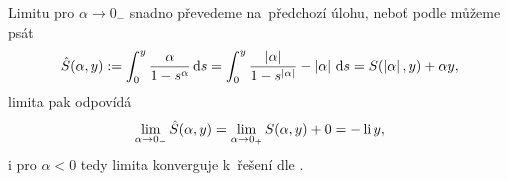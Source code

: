 Limitu pro $\alpha \to 0_-$ snadno převedeme na~předchozí úlohu, neboť podle  můžeme psát
\begin{equation}
    \hat{S}(\alpha,y)
    :=\int_0^{y}\frac{\alpha}{1-s^{\alpha}}\,\mathrm{d}{s}
    =\int_0^{y}\frac{\left\lvert\alpha\right\rvert}{1-s^{\left\lvert\alpha\right\rvert}}-\left\lvert\alpha\right\rvert\,\mathrm{d}{s}
    =S(\left\lvert\alpha\right\rvert,y)+\alpha y,
\end{equation}
limita pak odpovídá
\begin{equation}
    \lim_{\alpha \to 0_-}\hat{S}(\alpha, y)=\lim_{\alpha \to 0_+}S(\alpha, y)+0=-\operatorname{li}{y},
\end{equation}
i pro $\alpha<0$ tedy limita konverguje k~řešení dle .

